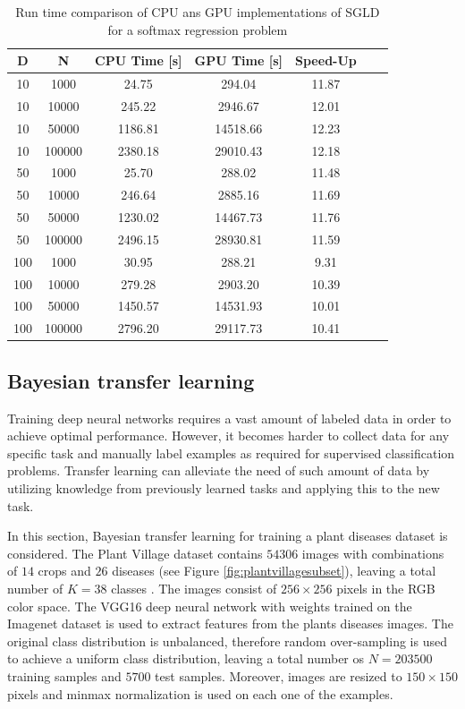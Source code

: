 \documentclass[conference]{IEEEtran}
\begin{document}
\begin{table}[h]
	\centering
	\begin{tabular}{|c|c|c|c|c|c|c|}
		\hline 
		D & N & CPU Time [s] & GPU Time [s]  & Speed-Up\\ 
		\hline 		
10	& 1000& 	24.75& 294.04  & 11.87\\
10	& 10000& 	245.22& 2946.67	& 12.01\\
10	& 50000& 	1186.81& 14518.66 & 12.23\\
10	& 100000	& 2380.18& 29010.43& 12.18\\
\hline
50	& 1000	& 25.70& 288.02	& 11.48\\
50	& 10000	& 246.64& 2885.16& 11.69\\
50	& 50000	& 1230.02& 14467.73	& 11.76\\
50 & 	100000	& 2496.15& 28930.81	& 11.59\\
\hline
100	& 1000	& 30.95& 288.21& 9.31\\
100	& 10000	& 279.28& 2903.20& 10.39\\
100	& 50000	& 1450.57& 14531.93& 10.01\\
100	& 100000& 	2796.20& 29117.73& 10.41\\

		\hline 
\end{tabular}
\caption{Run time comparison of CPU ans GPU implementations of SGLD for a softmax regression problem}
\label{tab:sgld} 
\end{table}

\subsection{Bayesian transfer learning}

 
Training deep neural networks requires a vast amount of labeled data in order to achieve optimal performance. However, it becomes harder to collect data for any specific task and manually label examples as required for supervised classification problems. Transfer learning can alleviate the need of such amount of data by utilizing knowledge from previously learned tasks and applying this to the new task. 

In this section, Bayesian transfer learning for training a plant diseases dataset is considered. The Plant Village dataset contains $54306$ images with combinations of $14$ crops and $26$ diseases (see Figure \ref{fig:plantvillagesubset}), leaving a total number of $K=38$ classes \cite{mohanty2016using}. The images consist of $256 \times 256$ pixels in the RGB color space.  The VGG16 deep neural network with weights trained on the Imagenet dataset is used to extract features from the plants diseases images. The original class distribution is unbalanced, therefore random over-sampling is used to achieve a uniform class distribution, leaving a total number os $N=203500$ training samples and $5700$ test samples. Moreover, images are resized to $150 \times 150$ pixels and min\-max normalization is used on each one of the examples.
\end{document}

